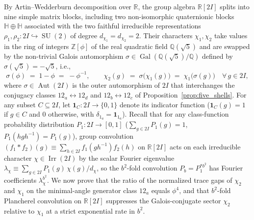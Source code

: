 \documentclass[11pt,a4paper]{article}
\theoremstyle{definition}
\theoremstyle{remark}
\newcommand{\R}{\mathbb{R}}
\newcommand{\quat}{\mathbb{H}}
\newcommand{\Z}{\mathbb{Z}}
\newcommand{\Q}{\mathbb{Q}}
\newcommand{\Irr}{\operatorname{Irr}}
\newcommand{\SU}{\operatorname{SU}}
\begin{document}
By Artin--Wedderburn decomposition over $\R$, the group algebra $\R[2I]$ splits into nine simple matrix blocks, including two non-isomorphic quaternionic blocks $\quat \oplus \quat$ associated with the two faithful irreducible representations $\rho_1, \rho_2 : 2I \hookrightarrow \SU(2)$ of degree $d_{\chi_1} = d_{\chi_2} = 2$. Their characters $\chi_1, \chi_2$ take values in the ring of integers $\Z[\phi]$ of the real quadratic field $\Q(\sqrt{5})$ and are swapped by the non-trivial Galois automorphism $\sigma \in \operatorname{Gal}(\Q(\sqrt{5})/\Q)$ defined by $\sigma(\sqrt{5}) = -\sqrt{5}$, i.e.,
\begin{equation}
\label{eq:galois_swap}
\sigma(\phi) \;=\; 1 - \phi \;=\; -\phi^{-1}, \qquad \chi_2(g) \;=\; \sigma\bigl(\chi_1(g)\bigr) \;=\; \chi_1\bigl(\sigma(g)\bigr) \quad \forall\, g \in 2I,
\end{equation}
where $\sigma \in \operatorname{Aut}(2I)$ is the outer automorphism of $2I$ that interchanges the conjugacy classes $12_a \leftrightarrow 12_d$ and $12_b \leftrightarrow 12_c$ of Proposition~\ref{prop:five_shells}. For any subset $C \subseteq 2I$, let $\mathbf{1}_C : 2I \to \{0, 1\}$ denote its indicator function ($\mathbf{1}_C(g) = 1$ if $g \in C$ and $0$ otherwise, with $\delta_{1_a} = \mathbf{1}_{1_a}$). Recall that for any class-function probability distribution $P_1 : 2I \to [0, 1]$ ($\sum_{g \in 2I} P_1(g) = 1$, $P_1(hgh^{-1}) = P_1(g)$), group convolution $(f_1 * f_2)(g) \equiv \sum_{h \in 2I} f_1(gh^{-1})f_2(h)$ on $\R[2I]$ acts on each irreducible character $\chi \in \Irr(2I)$ by the scalar Fourier eigenvalue $\lambda_\chi \equiv \sum_{g \in 2I} P_1(g)\,\chi(g)/d_\chi$, so the $b^2$-fold convolution $P_b = P_1^{* b^2}$ has Fourier coefficients $\lambda_\chi^{b^2}$. We now prove that the ratio of the normalized trace gaps of $\chi_2$ and $\chi_1$ on the minimal-angle generator class $12_a$ equals $\phi^4$, and that $b^2$-fold Plancherel convolution on $\R[2I]$ suppresses the Galois-conjugate sector $\chi_2$ relative to $\chi_1$ at a strict exponential rate in $b^2$.
\end{document}
